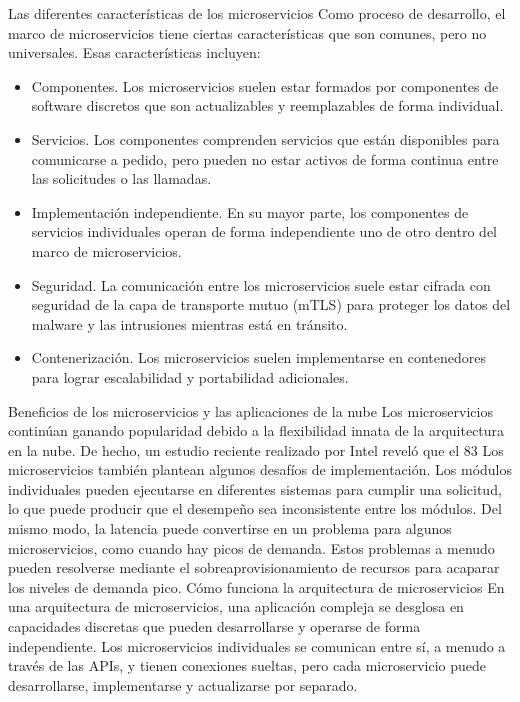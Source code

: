 \documentclass[12pt]{article}
\begin{document}
Las diferentes características de los microservicios
Como proceso de desarrollo, el marco de microservicios tiene ciertas características que son comunes, pero no universales.
Esas características incluyen:
\begin{itemize}
\item Componentes. Los microservicios suelen estar formados por componentes de software discretos que son actualizables y reemplazables de forma individual. 
\item Servicios. Los componentes comprenden servicios que están disponibles para comunicarse a pedido, pero pueden no estar activos de forma continua entre las solicitudes o las llamadas.
\item Implementación independiente. En su mayor parte, los componentes de servicios individuales operan de forma independiente uno de otro dentro del marco de microservicios. 
\item Seguridad. La comunicación entre los microservicios suele estar cifrada con seguridad de la capa de transporte mutuo (mTLS) para proteger los datos del malware y las intrusiones mientras está en tránsito.
\item Contenerización. Los microservicios suelen implementarse en contenedores para lograr escalabilidad y portabilidad adicionales.
\end{itemize}
Beneficios de los microservicios y las aplicaciones de la nube
Los microservicios continúan ganando popularidad debido a la flexibilidad innata de la arquitectura en la nube. De hecho, un estudio reciente realizado por Intel reveló que el 83 %
Los microservicios también plantean algunos desafíos de implementación. Los módulos individuales pueden ejecutarse en diferentes sistemas para cumplir una solicitud, lo que puede producir que el desempeño sea inconsistente entre los módulos.
Del mismo modo, la latencia puede convertirse en un problema para algunos microservicios, como cuando hay picos de demanda. Estos problemas a menudo pueden resolverse mediante el sobreaprovisionamiento de recursos para acaparar los niveles de demanda pico.
Cómo funciona la arquitectura de microservicios
En una arquitectura de microservicios, una aplicación compleja se desglosa en capacidades discretas que pueden desarrollarse y operarse de forma independiente. Los microservicios individuales se comunican entre sí, a menudo a través de las APIs, y tienen conexiones sueltas, pero cada microservicio puede desarrollarse, implementarse y actualizarse por separado.
\end{document}
